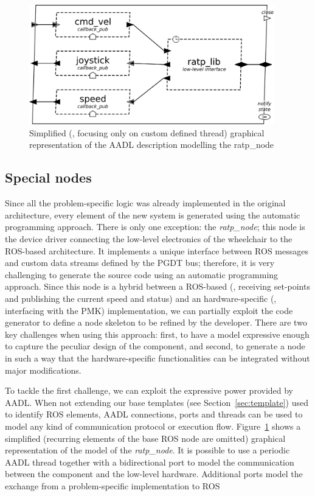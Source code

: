\begin{figure}[t]
\centering
\includegraphics[width=0.95\textwidth]{gfx/pmk/ratp}
\caption[Simplified graphical representation of the AADL description modelling the ratp\_node]{Simplified (\ie, focusing only on custom defined thread) graphical representation of the AADL description modelling the ratp\_node}
\label{fig:pmk-ratp}
\end{figure}

\subsection{Special nodes}
\label{sec:special-node}
Since all the problem-specific logic was already implemented in the original architecture, every element of the new system is generated using the automatic programming approach. There is only one exception: the \textit{ratp\_node}; this node is the device driver connecting the low-level electronics of the wheelchair to the ROS-based architecture. It implements a unique interface between ROS messages and custom data streams defined by the PGDT bus; therefore, it is very challenging to generate the source code using an automatic programming approach. Since this node is a hybrid between a ROS-based (\ie, receiving set-points and publishing the current speed and status) and an hardware-specific (\ie, interfacing with the PMK) implementation, we can partially exploit the code generator to define a node skeleton to be refined by the developer. There are two key challenges when using this approach: first, to have a model expressive enough to capture the peculiar design of the component, and second, to generate a node in such a way that the hardware-specific functionalities can be integrated without major modifications.

To tackle the first challenge, we can exploit the expressive power provided by AADL. When not extending our base templates (see Section~\ref{sec:template}) used to identify ROS elements,  AADL connections, ports and threads can be used to model any kind of communication protocol or execution flow. Figure~\ref{fig:pmk-ratp} shows a simplified (recurring elements of the base ROS node are omitted) graphical representation of the model of the \textit{ratp\_node}. It is possible to use a periodic AADL thread together with a bidirectional port to model the communication between the component and the low-level hardware. Additional ports model the exchange from a problem-specific implementation to ROS

